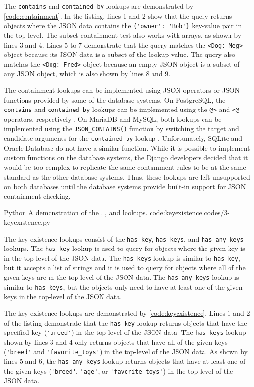 The \verb|contains| and \verb|contained_by| lookups are demonstrated by
\autoref{code:containment}. In the listing, lines 1 and 2 show that the query
returns objects where the JSON data contains the \verb|{'owner': 'Bob'}|
key-value pair in the top-level. The subset containment test also works with
arrays, as shown by lines 3 and 4. Lines 5 to 7 demonstrate that the query
matches the \verb|<Dog: Meg>| object because its JSON data is a subset of the
lookup value. The query also matches the \verb|<Dog: Fred>| object because an
empty JSON object is a subset of any JSON object, which is also shown by lines
8 and 9.

The containment lookups can be implemented using JSON operators or JSON
functions provided by some of the database systems. On PostgreSQL, the
\verb|contains| and \verb|contained_by| lookups can be implemented using the
\verb|@>| and \verb|<@| operators, respectively \cite{postgres:json_operators}.
On MariaDB and MySQL, both lookups can be implemented using the
\verb|JSON_CONTAINS()| function by switching the target and candidate arguments
for the \verb|contained_by| lookup \cite{mariadb:json_contains,
mysql:json_search}. Unfortunately, SQLite and Oracle Database do not have a
similar function. While it is possible to implement custom functions on the
database systems, the Django developers decided that it would be too complex to
replicate the same containment rules to be at the same standard as the other
database systems. Thus, these lookups are left unsupported on both databases
until the database systems provide built-in support for JSON containment
checking.

\listing
{Python}
{A demonstration of the
, , and  lookups.}
{code:keyexistence}
{codes/3-keyexistence.py}

The key existence lookups consist of the \verb|has_key|, \verb|has_keys|, and
\verb|has_any_keys| lookups. The \verb|has_key| lookup is used to query for
objects where the given key is in the top-level of the JSON data. The
\verb|has_keys| lookup is similar to \verb|has_key|, but it accepts a list of
strings and it is used to query for objects where all of the given keys are
in the top-level of the JSON data. The \verb|has_any_keys| lookup is similar
to \verb|has_keys|, but the objects only need to have at least one of the
given keys in the top-level of the JSON data.

The key existence lookups are demonstrated by \autoref{code:keyexistence}.
Lines 1 and 2 of the listing demonstrate that the \verb|has_key| lookup
returns objects that have the specified key (\verb|'breed'|) in the top-level
of the JSON data. The \verb|has_keys| lookup shown by lines 3 and 4 only
returns objects that have all of the given keys (\verb|'breed'| and
\verb|'favorite_toys'|) in the top-level of the JSON data. As shown by lines 5
and 6, the \verb|has_any_keys| lookup returns objects that have at least one
of the given keys (\verb|'breed'|, \verb|'age'|, or \verb|'favorite_toys'|) in
the top-level of the JSON data.

